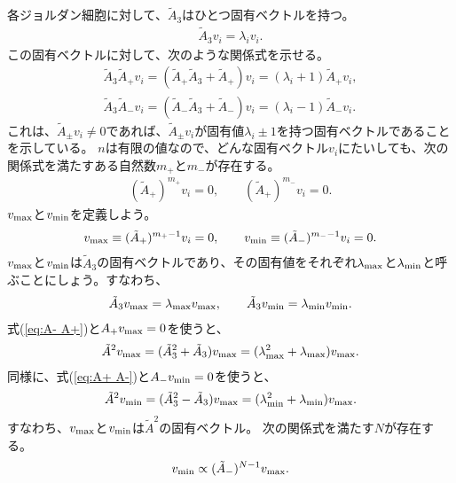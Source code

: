\documentclass[10pt,a4paper]{jarticle}
\begin{document}
各ジョルダン細胞に対して、$\tilde A_3$はひとつ固有ベクトルを持つ。
\begin{align}
\tilde A_3 v_i = \lambda_i v_i.
\end{align}
%
この固有ベクトルに対して、次のような関係式を示せる。
\begin{align}
\tilde A_3 \tilde A_+ v_i = 
(\tilde A_+ \tilde A_3 + \tilde A_+) v_i = 
(\lambda_i + 1) \tilde A_+ v_i, \\
%
\tilde A_3 \tilde A_- v_i = 
(\tilde A_- \tilde A_3 + \tilde A_-) v_i = 
(\lambda_i - 1) \tilde A_- v_i.
\end{align}
%
これは、$\tilde A_\pm v_i \neq 0$であれば、$\tilde A_\pm v_i$が固有値$\lambda_i \pm 1$を持つ固有ベクトルであることを示している。
$n$は有限の値なので、どんな固有ベクトル$v_i$にたいしても、次の関係式を満たすある自然数$m_+$と$m_-$が存在する。
\begin{align}
(\tilde A_+)^{m_+} v_i = 0, \qquad
(\tilde A_+)^{m_-} v_i = 0.
\end{align}
%
$v_{\rm max}$と$v_{\rm min}$を定義しよう。
\begin{align}
v_{\rm max} \equiv (\tilde A_+)^{m_+-1} v_i = 0, \qquad
v_{\rm min} \equiv (\tilde A_-)^{m_--1} v_i = 0.
\end{align}
%
$v_{\rm max}$と$v_{\rm min}$は$\tilde A_3$の固有ベクトルであり、その固有値をそれぞれ$\lambda_{\rm max}$と$\lambda_{\rm min}$と呼ぶことにしょう。すなわち、
\begin{align}
\tilde A_3 v_{\rm max} = \lambda_{\rm max} v_{\rm max}, \qquad
\tilde A_3 v_{\rm min} = \lambda_{\rm min} v_{\rm min}.
\end{align}
%
式(\ref{eq:A- A+})と$A_+ v_{\rm max} = 0$を使うと、
\begin{align}
\tilde A^2 v_{\rm max} = (\tilde A_3^2 + \tilde A_3) v_{\rm max} = (\lambda_{\rm max}^2 + \lambda_{\rm max} ) v_{\rm max} .
\end{align}
%
同様に、式(\ref{eq:A+ A-})と$A_- v_{\rm min} = 0$を使うと、
\begin{align}
\tilde A^2 v_{\rm min} = (\tilde A_3^2 - \tilde A_3) v_{\rm max} = (\lambda_{\rm min}^2 + \lambda_{\rm min} ) v_{\rm max} .
\end{align}
%
すなわち、$v_{\rm max}$と$v_{\rm min}$は$\tilde A^2$の固有ベクトル。
次の関係式を満たす$N$が存在する。
\begin{align}
v_{\rm min} \propto (\tilde A_-)^{N-1} v_{\rm max}.
\end{align}
\end{document}

